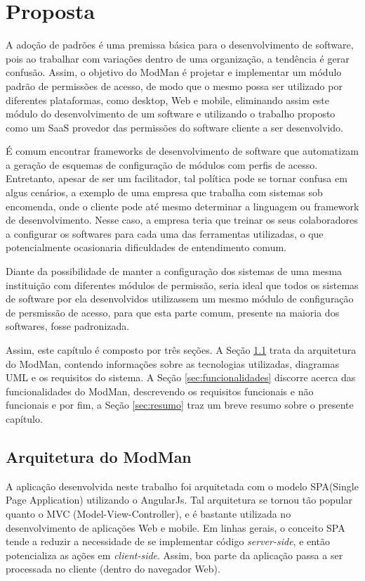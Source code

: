 \chapter{Proposta}


A adoção de padrões é uma premissa básica para o desenvolvimento de software, pois ao trabalhar com variações dentro de uma organização, a tendência é gerar confusão. Assim, o objetivo do ModMan é projetar e implementar um módulo padrão de permissões de acesso, de modo que o mesmo possa ser utilizado por diferentes plataformas, como desktop, Web e mobile, eliminando assim este módulo do desenvolvimento de um software e utilizando o trabalho proposto como um SaaS provedor das permissões do software cliente a ser desenvolvido.


É comum encontrar frameworks de desenvolvimento de software que automatizam a geração de esquemas de configuração de módulos com perfis de acesso. Entretanto, apesar de ser um facilitador, tal política pode se tornar confusa em algus cenários, a exemplo de uma empresa que trabalha com sistemas sob encomenda, onde o cliente pode até mesmo determinar a linguagem ou framework de desenvolvimento. Nesse caso, a empresa teria que treinar os seus colaboradores a configurar os softwares para cada uma das ferramentas utilizadas, o que potencialmente ocasionaria dificuldades de entendimento comum.


Diante da possibilidade de manter a configuração dos sistemas de uma mesma instituição com diferentes módulos de permissão, seria ideal que todos os sistemas de software por ela desenvolvidos utilizassem um mesmo módulo de configuração de persmissão de acesso, para que esta parte comum, presente na maioria dos softwares, fosse padronizada.


Assim, este capítulo é composto por três seções. A Seção \ref{sec:arquitetura} trata da arquitetura do ModMan, contendo informações sobre as tecnologias utilizadas, diagramas UML e os requisitos do sistema. A Seção \ref{sec:funcionalidades} discorre acerca das funcionalidades do ModMan, descrevendo os requisitos funcionais e não funcionais e por fim, a Seção \ref{sec:resumo} traz um breve resumo sobre o presente capítulo.


\section{Arquitetura do ModMan}\label{sec:arquitetura}


A aplicação desenvolvida neste trabalho foi arquitetada com o modelo SPA(Single Page Application) utilizando o AngularJs. Tal arquitetura se tornou tão popular quanto o MVC (Model-View-Controller), e é bastante utilizada no desenvolvimento de aplicações Web e mobile. Em linhas gerais, o conceito SPA tende a reduzir a necessidade de se implementar código \textit{server-side}, e então potencializa as ações em \textit{client-side}. Assim, boa parte da aplicação passa a ser processada no cliente (dentro do navegador Web).


